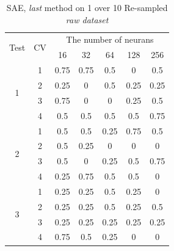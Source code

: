 \documentclass[draft,dvipsnames]{drexel-thesis}
\begin{document}
\begin{thesis}
\begin{table}[!t]
\centering
\caption{SAE, {\em last} method on 1 over 10 Re-sampled {\em raw dataset}}
\label{tbl:sae_last_1_10}
\begin{tabular}{|c|c|c|c|c|c|c|}
\hline
\multirow{2}{*}{Test} & \multirow{2}{*}{CV} & \multicolumn{5}{c|}{The number of neurans}                               \\ \cline{3-7} 
                      &                     & 16           & 32           & 64           & 128          & 256          \\ \hline
\multirow{4}{*}{1}    & 1                   & 0.75         & 0.75         & 0.5          & 0            & 0.5          \\ \cline{2-7} 
                      & 2                   & 0.25         & 0            & 0.5          & 0.25         & 0.25         \\ \cline{2-7} 
                      & 3                   & 0.75         & 0            & 0            & 0.25         & 0.5          \\ \cline{2-7} 
                      & 4                   & 0.5          & 0.5          & 0.5          & 0.5          & 0.75         \\ \hline
\multirow{4}{*}{2}    & 1                   & 0.5          & 0.5          & 0.25         & 0.75         & 0.5          \\ \cline{2-7} 
                      & 2                   & 0.5          & 0.25         & 0            & 0            & 0            \\ \cline{2-7} 
                      & 3                   & 0.5          & 0            & 0.25         & 0.5          & 0.75         \\ \cline{2-7} 
                      & 4                   & 0.25         & 0.75         & 0.5          & 0.5          & 0            \\ \hline
\multirow{4}{*}{3}    & 1                   & 0.25         & 0.25         & 0.5          & 0.25         & 0            \\ \cline{2-7} 
                      & 2                   & 0.25         & 0.25         & 0.5          & 0.25         & 0.5          \\ \cline{2-7} 
                      & 3                   & 0.25         & 0.25         & 0.25         & 0.25         & 0.25         \\ \cline{2-7} 
                      & 4                   & 0.75         & 0.5          & 0.25         & 0            & 0            \\ \hline

\end{tabular}
\end{table}
\end{thesis}
\end{document}
